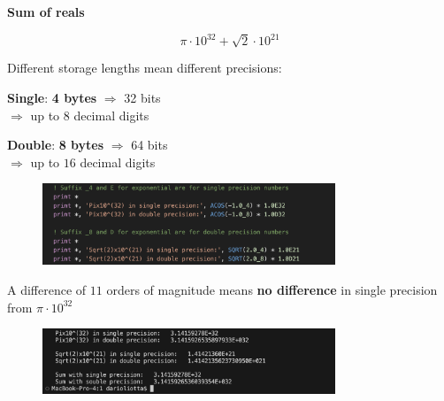 \documentclass[10pt,externalviewer]{beamer}
\begin{document}
\begin{frame}
\begin{minipage}{0.45\textwidth}
   \end{minipage}
   \hfill
   \begin{minipage}{0.45\textwidth}

      \begin{center}
         \textbf{Sum of reals}

         \vspace{-0.5cm}

         \scriptsize{$$\pi\cdot10^{32}+\sqrt{2}\cdot10^{21}$$}
      \end{center}

      \footnotesize{Different storage lengths mean different precisions:}

      \begin{itemize}
         \footnotesize{\item \textcolor{BrickRed}{\textbf{Single}}: \textbf{4 bytes} $\Rightarrow$ 32 bits\\ $\Rightarrow$ up to $8$ decimal digits}
         \footnotesize{\item \textcolor{BrickRed}{\textbf{Double}}: \textbf{8 bytes} $\Rightarrow$ 64 bits\\ $\Rightarrow$ up to $16$ decimal digits}
      \end{itemize}

      \vspace{-0.25cm}

      \begin{figure}[H]
         \centering
         \includegraphics[width=0.78\textwidth]{Immagini/real-sum-code.png}
      \end{figure}

      \footnotesize{A difference of $11$ orders of magnitude means \textcolor{BrickRed}{\textbf{no difference}} in single precision from $\pi\cdot10^{32}$}

      \begin{figure}[H]
         \centering
         \includegraphics[width=0.78\textwidth]{Immagini/real-sum-output.png}
      \end{figure}

   \end{minipage}
\end{frame}
\end{document}
